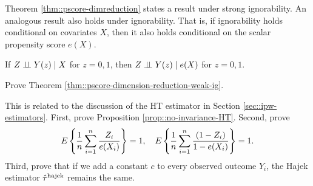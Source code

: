 \begin{HomeworkProblem}\label{exr:11-2}

Theorem \ref{thm::pscore-dimreduction} states a result under strong ignorability. An analogous result also holds under ignorability.
That is, if ignorability holds conditional on covariates $X$, then it also holds conditional on the scalar propensity score $e(X)$.

\begin{Theorem}
\label{thm::pscore-dimension-reduction-weak-ig}
If $Z\mathrel{\perp\!\!\!\perp} Y(z)  \mid X$ for $z=0,1$, then
$
Z\mathrel{\perp\!\!\!\perp} Y(z)\mid e(X)
$
for $z=0,1$.
\end{Theorem}


Prove Theorem \ref{thm::pscore-dimension-reduction-weak-ig}.




\end{HomeworkProblem}

\begin{HomeworkProblem}\label{exr:11-3}

This is related to the discussion of the HT estimator in Section \ref{sec::ipw-estimators}. First, prove Proposition \ref{prop::no-invariance-HT}.
Second, prove
 \begin{eqnarray*}
E\left\{ \frac{1}{n} \sum_{i=1}^n \frac{Z_i }{e(X_i) } \right\} =1,\quad
E\left\{  \frac{1}{n} \sum_{i=1}^n \frac{ (1-Z_i) }{ 1 - e(X_i) }  \right\} = 1.
\end{eqnarray*}
Third, prove that if we add a constant $c$ to every observed outcome $Y_i$, the Hajek estimator
$
\hat{\tau}^\textup{hajek}
$
remains the same.


\end{HomeworkProblem}

